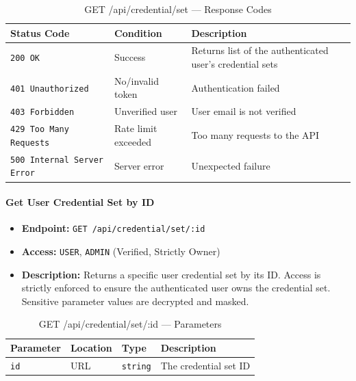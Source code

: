 \begin{table}[H]
\centering
\renewcommand{\arraystretch}{1.3}
\begin{tabularx}{\textwidth}{|l|l|X|}
\hline
\textbf{Status Code} & \textbf{Condition} & \textbf{Description} \\
\hline
\texttt{200 OK}           & Success       & Returns list of the authenticated user's credential sets \\
\hline
\texttt{401 Unauthorized} & No/invalid token  & Authentication failed \\
\hline
\texttt{403 Forbidden}    & Unverified user & User email is not verified \\
\hline
\texttt{429 Too Many Requests} & Rate limit exceeded & Too many requests to the API \\
\hline
\texttt{500 Internal Server Error} & Server error & Unexpected failure \\
\hline
\end{tabularx}
\caption{GET /api/credential/set — Response Codes}
\label{tab:get-user-credential-sets-responses}
\end{table}
\FloatBarrier

\paragraph{Get User Credential Set by ID}
\label{subsubsec:get-user-credential-set-by-id}

\begin{itemize}
  \item \textbf{Endpoint:} \texttt{GET /api/credential/set/:id}
  \item \textbf{Access:} \texttt{USER}, \texttt{ADMIN} (Verified, Strictly Owner)
  \item \textbf{Description:} Returns a specific user credential set by its ID.
  Access is strictly enforced to ensure the authenticated user owns the credential set. Sensitive parameter values are decrypted and masked.
\end{itemize}

\begin{table}[H]
\centering
\renewcommand{\arraystretch}{1.3}
\begin{tabularx}{\textwidth}{|l|l|l|X|}
\hline
\textbf{Parameter} & \textbf{Location} & \textbf{Type} & \textbf{Description} \\
\hline
\texttt{id} & URL & \texttt{string} & The credential set ID \\
\hline
\end{tabularx}
\caption{GET /api/credential/set/:id — Parameters}
\label{tab:get-user-credential-set-by-id-params}
\end{table}

